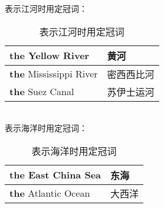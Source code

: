 \documentclass[UTF8]{ctexart}
\begin{document}
    表示江河时用定冠词：
    \begin{table}[h!]
        \begin{center}
            \ttfamily
            \begin{tabular}{p{180pt}|p{100pt}}
                \hline
                \textbf{the} Yellow River&黄河\\ \hline
                \textbf{the} Mississippi River&密西西比河\\ \hline
                \textbf{the} Suez Canal&苏伊士运河\\ \hline
            \end{tabular}
            \rmfamily
            \caption{表示江河时用定冠词}
        \end{center}
    \end{table}\\
    表示海洋时用定冠词：
    \begin{table}[h!]
        \begin{center}
            \ttfamily
            \begin{tabular}{p{180pt}|p{100pt}}
                \hline
                \textbf{the} East China Sea&东海\\ \hline
                \textbf{the} Atlantic Ocean&大西洋\\ \hline
            \end{tabular}
            \rmfamily
            \caption{表示海洋时用定冠词}
        \end{center}
    \end{table}

\newpage
\end{document}
